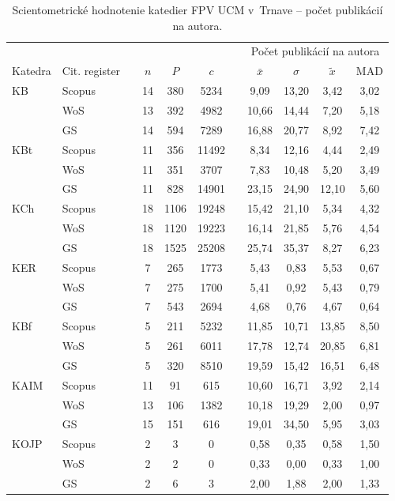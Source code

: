 \begin{table}
  \centering\small
  \caption[Hodnotenie FPV -- počet publikácií na autora]%
  {Scientometrické hodnotenie katedier FPV UCM v~Trnave -- počet publikácií na
    autora.}
  \label{tab:1-staff.results}
  \begin{tabularx}{\textwidth}{XXp{0.7ex}c@{\hspace{2.5em}}c@{\hspace{2.5em}}cp{0.7ex}cccc}
    \toprule
    & & & & & & & \multicolumn{4}{c}{Počet publikácií na autora} \\
    \cmidrule{8-11}
    Katedra & Cit. register & & $n$ & $P$ & $c$ & & $\bar{x}$ & $\sigma$ & $\tilde{x}$ & MAD \\
    \midrule
    KB   & Scopus & & 14 & 380  & 5234  & & 9,09  & 13,20 & 3,42  & 3,02 \\
         & WoS    & & 13 & 392  & 4982  & & 10,66 & 14,44 & 7,20  & 5,18 \\
         & GS     & & 14 & 594  & 7289  & & 16,88 & 20,77 & 8,92  & 7,42 \\[1ex]
    KBt  & Scopus & & 11 & 356  & 11492 & & 8,34  & 12,16 & 4,44  & 2,49 \\
         & WoS    & & 11 & 351  & 3707  & & 7,83  & 10,48 & 5,20  & 3,49 \\
         & GS     & & 11 & 828  & 14901 & & 23,15 & 24,90 & 12,10 & 5,60 \\[1ex]
    KCh  & Scopus & & 18 & 1106 & 19248 & & 15,42 & 21,10 & 5,34  & 4,32 \\
         & WoS    & & 18 & 1120 & 19223 & & 16,14 & 21,85 & 5,76  & 4,54 \\
         & GS     & & 18 & 1525 & 25208 & & 25,74 & 35,37 & 8,27  & 6,23 \\[1ex]
    KER  & Scopus & & 7  & 265  & 1773  & & 5,43  & 0,83  & 5,53  & 0,67 \\
         & WoS    & & 7  & 275  & 1700  & & 5,41  & 0,92  & 5,43  & 0,79 \\
         & GS     & & 7  & 543  & 2694  & & 4,68  & 0,76  & 4,67  & 0,64 \\[1ex]
    KBf  & Scopus & & 5  & 211  & 5232  & & 11,85 & 10,71 & 13,85 & 8,50 \\
         & WoS    & & 5  & 261  & 6011  & & 17,78 & 12,74 & 20,85 & 6,81 \\
         & GS     & & 5  & 320  & 8510  & & 19,59 & 15,42 & 16,51 & 6,48 \\[1ex]
    KAIM & Scopus & & 11 & 91   & 615   & & 10,60 & 16,71 & 3,92  & 2,14 \\
         & WoS    & & 13 & 106  & 1382  & & 10,18 & 19,29 & 2,00  & 0,97 \\
         & GS     & & 15 & 151  & 616   & & 19,01 & 34,50 & 5,95  & 3,03 \\[1ex]
    KOJP & Scopus & & 2  & 3    & 0     & & 0,58  & 0,35  & 0,58  & 1,50 \\
         & WoS    & & 2  & 2    & 0     & & 0,33  & 0,00  & 0,33  & 1,00 \\
         & GS     & & 2  & 6    & 3     & & 2,00  & 1,88  & 2,00  & 1,33 \\
    \bottomrule
  \end{tabularx}
\end{table}

